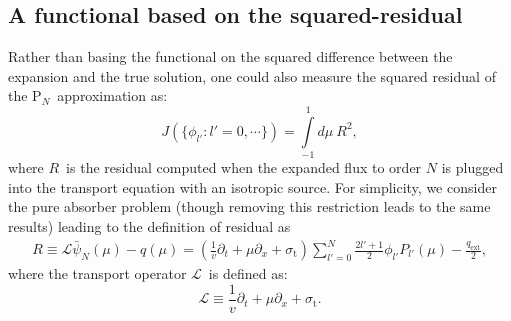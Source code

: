 \documentclass[review]{elsarticle}
\newcommand{\st}{\sigma_\mathrm{t}}
\newcommand{\pn}{P$_N$}
\newcommand{\ppz}{\partial_x}%
\newcommand{\psii}[1]{\phi_\ensuremath{{#1}}}
\begin{document}

\subsection{A functional based on the squared-residual}
%
Rather than basing the functional on the squared difference between the expansion and the true solution, one could also measure the squared residual of the \pn~approximation as:
\begin{equation}
J(\{\psii{l'}:l'=0,\cdots\})=\int\limits_{-1}^{1}d\mu~R^2,
\end{equation}
where $R$~is the residual computed when the expanded flux to order $N$ is plugged into the transport equation with an isotropic source. For  simplicity, we consider the pure absorber problem (though removing this restriction leads to the same results) leading to the definition of residual as
\begin{align}\label{res}
R\equiv\mathcal{L}\bar{\psi}_N(\mu)-q(\mu)
=\left(\frac{1}{v}\partial_t+\mu\ppz+\st\right)\sum\limits_{l'=0}^{N}\frac{2l'+1}{2}\psii{l'}P_{l'}(\mu)-\frac{q_\mathrm{ext}}{2},
\end{align}
where the transport operator $\mathcal{L}$~is defined as:
\begin{equation}
\mathcal{L}\equiv\frac{1}{v}\partial_t+\mu\ppz+\st.
\end{equation}
\end{document}
